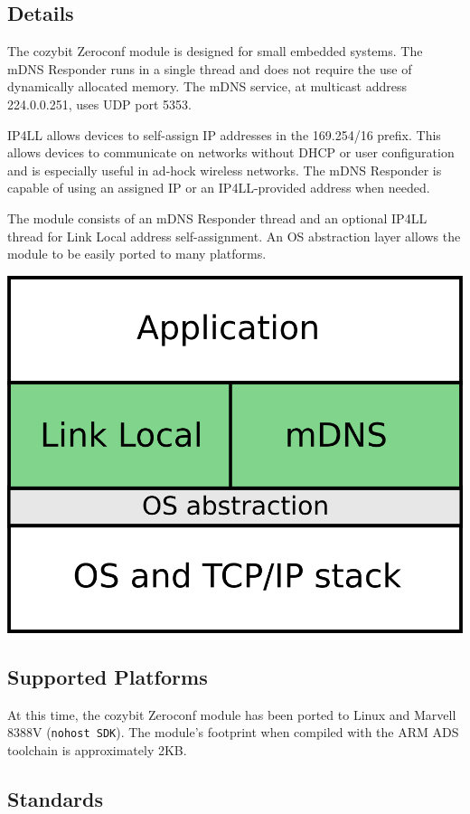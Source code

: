\documentclass[12pt,landscape,twocolumn]{article}
\begin{document}
\subsection*{Details}

The cozybit Zeroconf module is designed for small embedded systems.  The mDNS 
Responder runs in a single thread and does not require the use of dynamically 
allocated memory.  The mDNS service, at multicast address 224.0.0.251, uses 
UDP port 5353.

IP4LL allows devices to self-assign IP addresses in the 169.254/16 prefix. 
This allows devices to communicate on networks without DHCP or user 
configuration and is especially useful in ad-hock wireless networks.  The mDNS
Responder is capable of using an assigned IP or an IP4LL-provided address when
needed.

The module consists of an mDNS Responder thread and an optional IP4LL thread 
for Link Local address self-assignment.  An OS abstraction layer allows the 
module to be easily ported to many platforms.

\begin{center}
\includegraphics[width=40ex]{./figures/arch.png}
\end{center}

\subsection*{Supported Platforms}

At this time, the cozybit Zeroconf module has been ported to Linux and
Marvell 8388V ({\tt nohost SDK}).  The module's footprint when compiled with
the ARM ADS toolchain is approximately 2KB.

\pagebreak
\subsection*{Standards}
\end{document}
